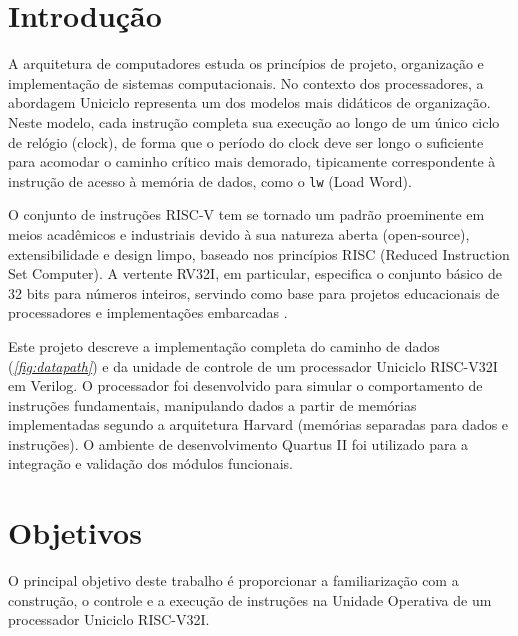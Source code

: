 \documentclass[conference]{IEEEtran}
\begin{document}
\section{Introdução}

A arquitetura de computadores estuda os princípios de projeto, organização e implementação de sistemas computacionais. No contexto dos processadores, a abordagem Uniciclo representa um dos modelos mais didáticos de organização. Neste modelo, cada instrução completa sua execução ao longo de um único ciclo de relógio (clock), de forma que o período do clock deve ser longo o suficiente para acomodar o caminho crítico mais demorado, tipicamente correspondente à instrução de acesso à memória de dados, como o \texttt{lw} (Load Word).

O conjunto de instruções RISC-V tem se tornado um padrão proeminente em meios acadêmicos e industriais devido à sua natureza aberta (open-source), extensibilidade e design limpo, baseado nos princípios RISC (Reduced Instruction Set Computer). A vertente RV32I, em particular, especifica o conjunto básico de 32 bits para números inteiros, servindo como base para projetos educacionais de processadores e implementações embarcadas \cite{riscv-spec}.

Este projeto descreve a implementação completa do caminho de dados (\textit{\ref{fig:datapath}}) e da unidade de controle de um processador Uniciclo RISC-V32I em Verilog. O processador foi desenvolvido para simular o comportamento de instruções fundamentais, manipulando dados a partir de memórias implementadas segundo a arquitetura Harvard (memórias separadas para dados e instruções). O ambiente de desenvolvimento Quartus II foi utilizado para a integração e validação dos módulos funcionais.

\section{Objetivos}

O principal objetivo deste trabalho é proporcionar a familiarização com a construção, o controle e a execução de instruções na Unidade Operativa de um processador Uniciclo RISC-V32I. 
\end{document}
